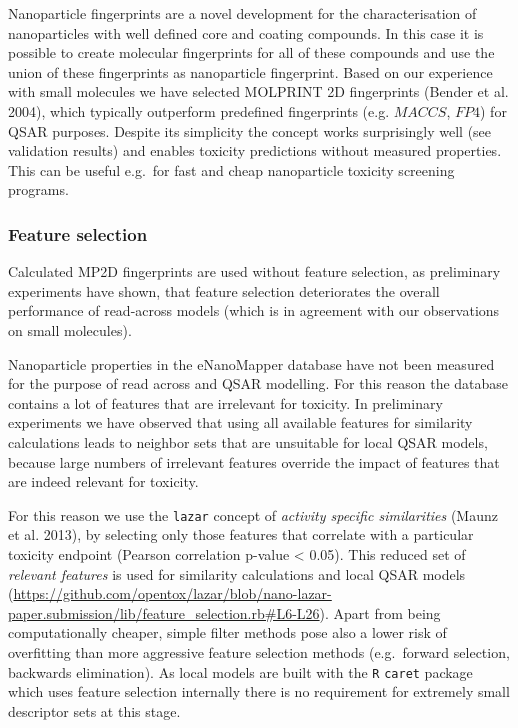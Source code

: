 \documentclass[utf8]{frontiersHLTH} %
\begin{document}
Nanoparticle fingerprints are a novel development for the
characterisation of nanoparticles with well defined core and coating
compounds. In this case it is possible to create molecular fingerprints
for all of these compounds and use the union of these fingerprints as
nanoparticle fingerprint. Based on our experience with small molecules
we have selected MOLPRINT 2D fingerprints (Bender et al. 2004), which
typically outperform predefined fingerprints (e.g. \(MACCS\), \(FP4\))
for QSAR purposes. Despite its simplicity the concept works surprisingly
well (see validation results) and enables toxicity predictions without
measured properties. This can be useful e.g.~for fast and cheap
nanoparticle toxicity screening programs.

\subsubsection{Feature selection}\label{feature-selection}

Calculated MP2D fingerprints are used without feature selection, as
preliminary experiments have shown, that feature selection deteriorates
the overall performance of read-across models (which is in agreement
with our observations on small molecules).

Nanoparticle properties in the eNanoMapper database have not been
measured for the purpose of read across and QSAR modelling. For this
reason the database contains a lot of features that are irrelevant for
toxicity. In preliminary experiments we have observed that using all
available features for similarity calculations leads to neighbor sets
that are unsuitable for local QSAR models, because large numbers of
irrelevant features override the impact of features that are indeed
relevant for toxicity.

For this reason we use the \texttt{lazar} concept of \emph{activity
specific similarities} (Maunz et al. 2013), by selecting only those
features that correlate with a particular toxicity endpoint (Pearson
correlation p-value \textless{} 0.05). This reduced set of
\emph{relevant features} is used for similarity calculations and local
QSAR models
(\url{https://github.com/opentox/lazar/blob/nano-lazar-paper.submission/lib/feature_selection.rb\#L6-L26}).
Apart from being computationally cheaper, simple filter methods pose
also a lower risk of overfitting than more aggressive feature selection
methods (e.g.~forward selection, backwards elimination). As local models
are built with the \texttt{R} \texttt{caret} package which uses feature
selection internally there is no requirement for extremely small
descriptor sets at this stage.
\end{document}
